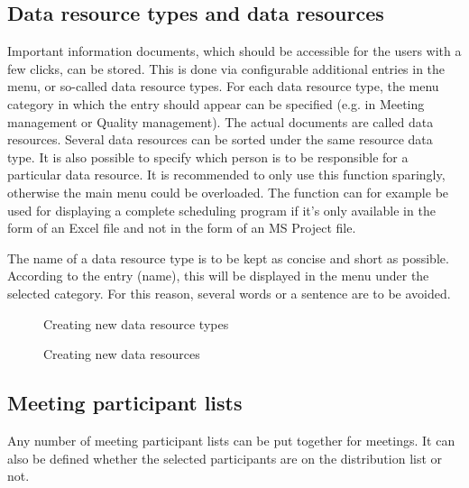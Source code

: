 \subsection{Data resource types and data resources}

Important information documents, which should be accessible for the users with a few clicks, can be stored. This is done via configurable additional entries in the menu, or so-called data resource types. For each data resource type, the menu category in which the entry should appear can be specified (e.g. in Meeting management or Quality management). The actual documents are called data resources. Several data resources can be sorted under the same resource data type. It is also possible to specify which person is to be responsible for a particular data resource. It is recommended to only use this function sparingly, otherwise the main menu could be overloaded. The function can for example be used for displaying a complete scheduling program if it's only available in the form of an Excel file and not in the form of an MS Project file.

\vspace{\baselineskip}

The name of a data resource type is to be kept as concise and short as possible. According to the entry (name), this will be displayed in the menu under the selected category. For this reason, several words or a sentence are to be avoided.

\begin{figure}[H]
\caption{Creating new data resource types}
\end{figure}

\begin{figure}[H]
\caption{Creating new data resources}
\end{figure}


\subsection{Meeting participant lists}

Any number of meeting participant lists can be put together for meetings. It can also be defined whether the selected participants are on the distribution list or not.

